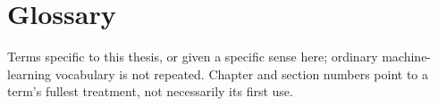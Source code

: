 
\section*{Glossary}

\begingroup\footnotesize\singlespacing   %
Terms specific to this thesis, or given a specific sense here; ordinary
machine-learning vocabulary is not repeated. Chapter and section numbers
point to a term's fullest treatment, not necessarily its first use.

